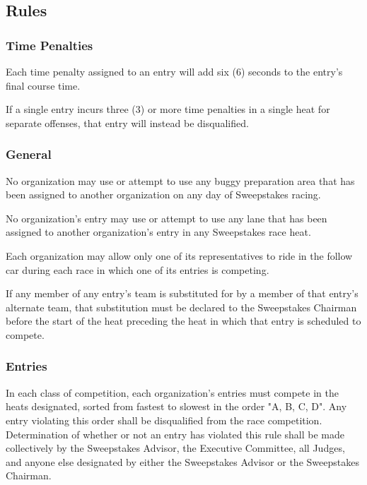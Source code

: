 \subsection{Rules} \label{Rules}

\subsubsection{Time Penalties}

    Each time penalty assigned to an entry will add six (6) seconds to the entry’s final course time.

    If a single entry incurs three (3) or more time penalties in a single heat for separate offenses, that entry will instead be disqualified.


\subsubsection{General}

	No organization may use or attempt to use any buggy preparation area that has been assigned to another organization on any day of Sweepstakes racing.

	No organization's entry may use or attempt to use any lane that has been assigned to another organization's entry in any Sweepstakes race heat.

	Each organization may allow only one of its representatives to ride in the follow car during each race in which one of its entries is competing.

	If any member of any entry's team is substituted for by a member of that entry's alternate team, that substitution must be declared to the Sweepstakes Chairman before the start of the heat preceding the heat in which that entry is scheduled to compete.

\subsubsection{Entries}

	In each class of competition, each organization's entries must compete in the heats designated, sorted from fastest to slowest in the order "A, B, C, D". Any entry violating this order shall be disqualified from the race competition. Determination of whether or not an entry has violated this rule shall be made collectively by the Sweepstakes Advisor, the Executive Committee, all Judges, and anyone else designated by either the Sweepstakes Advisor or the Sweepstakes Chairman.


